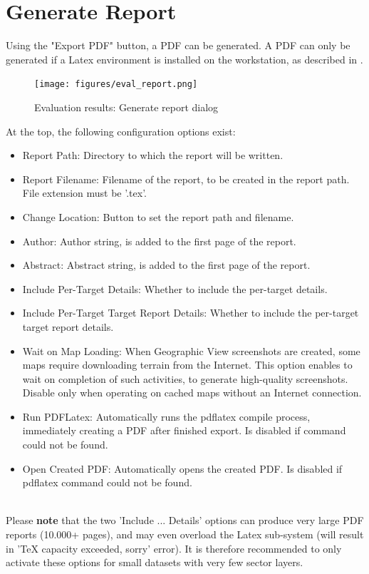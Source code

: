 \section{Generate Report}
\label{sec:eval_report}

Using the "Export PDF" button, a PDF can be generated. A PDF can only be generated if a Latex environment is installed on the workstation, as described in .

\begin{figure}[H]
    \texttt{[image: figures/eval\_report.png]}
  \caption{Evaluation results: Generate report dialog}
\end{figure}

At the top, the following configuration options exist:

\begin{itemize}  
\item Report Path: Directory to which the report will be written.
\item Report Filename: Filename of the report, to be created in the report path. File extension must be '.tex'.
\item Change Location: Button to set the report path and filename.
\item Author: Author string, is added to the first page of the report.
\item Abstract: Abstract string, is added to the first page of the report.
\item Include Per-Target Details: Whether to include the per-target details.
\item Include Per-Target Target Report Details: Whether to include the per-target target report details.
\item Wait on Map Loading: When Geographic View screenshots are created, some maps require downloading terrain from the Internet.  This option enables to wait on completion of such activities, to generate high-quality screenshots. Disable only when operating on cached maps without an Internet connection.
\item Run PDFLatex: Automatically runs the pdflatex compile process, immediately creating a PDF after finished export. Is disabled if command could not be found.
\item Open Created PDF: Automatically opens the created PDF. Is disabled if pdflatex command could not be found.
\end{itemize}
\ \\

Please \textbf{note} that the two 'Include ... Details' options can produce very large PDF reports (10.000+ pages), and may even overload the Latex sub-system (will result in 'TeX capacity exceeded, sorry' error). It is therefore recommended to only activate these options for small datasets with very few sector layers. \\

